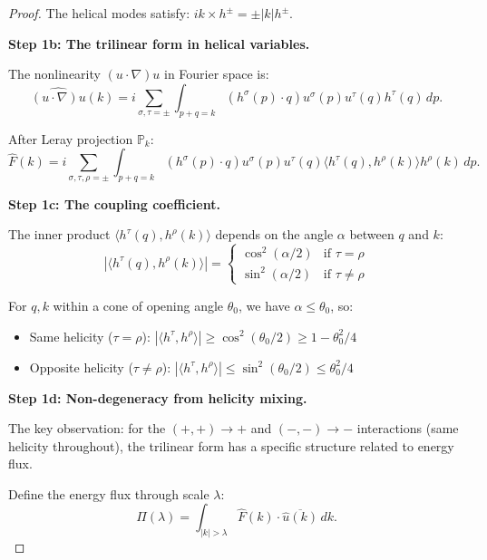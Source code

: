 \documentclass[11pt]{article}
\theoremstyle{definition}
\begin{document}
\begin{proof}
The helical modes satisfy: $ik \times h^\pm = \pm |k| h^\pm$.

\textbf{Step 1b: The trilinear form in helical variables.}

The nonlinearity $(u \cdot \nabla)u$ in Fourier space is:
\begin{equation}
\widehat{(u \cdot \nabla)u}(k) = i \sum_{\sigma, \tau = \pm} \int_{p+q=k} (h^\sigma(p) \cdot q) u^\sigma(p) u^\tau(q) h^\tau(q) \, dp.
\end{equation}

After Leray projection $\mathbb{P}_k$:
\begin{equation}
\hat{F}(k) = i \sum_{\sigma, \tau, \rho = \pm} \int_{p+q=k} (h^\sigma(p) \cdot q) u^\sigma(p) u^\tau(q) \langle h^\tau(q), h^\rho(k) \rangle h^\rho(k) \, dp.
\end{equation}

\textbf{Step 1c: The coupling coefficient.}

The inner product $\langle h^\tau(q), h^\rho(k) \rangle$ depends on the angle $\alpha$ between $q$ and $k$:
\begin{equation}
|\langle h^\tau(q), h^\rho(k) \rangle| = \begin{cases} \cos^2(\alpha/2) & \text{if } \tau = \rho \\ \sin^2(\alpha/2) & \text{if } \tau \neq \rho \end{cases}
\end{equation}

For $q, k$ within a cone of opening angle $\theta_0$, we have $\alpha \leq \theta_0$, so:
\begin{itemize}
\item Same helicity ($\tau = \rho$): $|\langle h^\tau, h^\rho \rangle| \geq \cos^2(\theta_0/2) \geq 1 - \theta_0^2/4$
\item Opposite helicity ($\tau \neq \rho$): $|\langle h^\tau, h^\rho \rangle| \leq \sin^2(\theta_0/2) \leq \theta_0^2/4$
\end{itemize}

\textbf{Step 1d: Non-degeneracy from helicity mixing.}

The key observation: for the $(+,+) \to +$ and $(-,-) \to -$ interactions (same helicity throughout), the trilinear form has a specific structure related to energy flux.

Define the energy flux through scale $\lambda$:
\begin{equation}
\Pi(\lambda) = \int_{|k| > \lambda} \hat{F}(k) \cdot \overline{\hat{u}(k)} \, dk.
\end{equation}


\end{proof}
\end{document}
